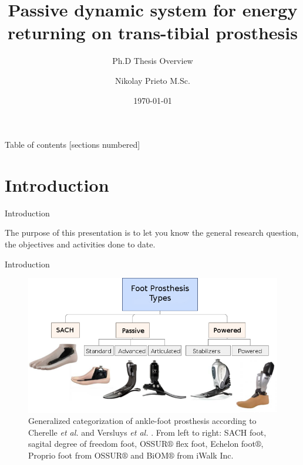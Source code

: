 \documentclass[10pt]{beamer}
\title{Passive dynamic system for energy returning on trans-tibial prosthesis}
\subtitle{Ph.D Thesis Overview}
\date{\today}
\date{}
\author{Nikolay Prieto M.Sc.}
\institute{Universidad Nacional de Colombia}
\begin{document}
\maketitle

\begin{frame}{Table of contents}
  [sections numbered]
  \tableofcontents[hideallsubsections]
\end{frame}

\section{Introduction}

\begin{frame}[fragile]{Introduction}

The purpose of this presentation is to let you know the general research question, the objectives and activities done to date.

\end{frame}

\begin{frame}[fragile]{Introduction}

\begin{figure}[H]
\begin{centering}
\includegraphics[scale=0.4]{GeneracionesprotesisEng}
\par\end{centering}

\caption{\label{fig:Categorizaci=0000F3n-seg=0000FAn-Cherelle} Generalized categorization of ankle-foot prosthesis according to Cherelle \emph{et al.}\cite{Cherelle2014a} and Versluys \emph{et al.} \cite{Versluys2009}. From left to right: SACH foot, sagital degree of freedom foot, OSSUR$\circledR$ flex foot, Echelon foot$\circledR$, Proprio foot from OSSUR$\circledR$ and BiOM$\circledR$ from iWalk Inc.}
\end{figure}
\end{frame}
\end{document}
